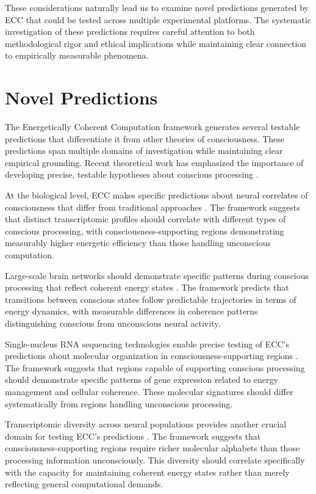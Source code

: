 \begin{refsection}
These considerations naturally lead us to examine novel predictions generated by ECC that could be tested across multiple experimental platforms. The systematic investigation of these predictions requires careful attention to both methodological rigor and ethical implications while maintaining clear connection to empirically measurable phenomena.

\section{Novel Predictions}

The Energetically Coherent Computation framework generates several testable predictions that differentiate it from other theories of consciousness. These predictions span multiple domains of investigation while maintaining clear empirical grounding. Recent theoretical work has emphasized the importance of developing precise, testable hypotheses about conscious processing \cite{Dehaene2014}.

At the biological level, ECC makes specific predictions about neural correlates of consciousness that differ from traditional approaches \cite{Koch2016}. The framework suggests that distinct transcriptomic profiles should correlate with different types of conscious processing, with consciousness-supporting regions demonstrating measurably higher energetic efficiency than those handling unconscious computation.

Large-scale brain networks should demonstrate specific patterns during conscious processing that reflect coherent energy states \cite{Mashour2018}. The framework predicts that transitions between conscious states follow predictable trajectories in terms of energy dynamics, with measurable differences in coherence patterns distinguishing conscious from unconscious neural activity.

Single-nucleus RNA sequencing technologies enable precise testing of ECC's predictions about molecular organization in consciousness-supporting regions \cite{Lake2016}. The framework suggests that regions capable of supporting conscious processing should demonstrate specific patterns of gene expression related to energy management and cellular coherence. These molecular signatures should differ systematically from regions handling unconscious processing.

Transcriptomic diversity across neural populations provides another crucial domain for testing ECC's predictions \cite{Tasic2018}. The framework suggests that consciousness-supporting regions require richer molecular alphabets than those processing information unconsciously. This diversity should correlate specifically with the capacity for maintaining coherent energy states rather than merely reflecting general computational demands.


\end{refsection}
